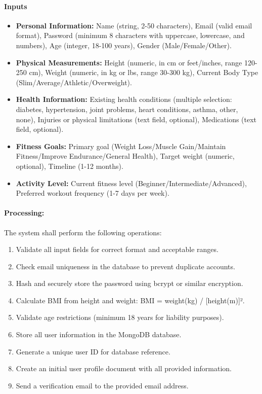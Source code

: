 \documentclass[12pt,a4paper]{article}
\begin{document}
\paragraph{Inputs}
\begin{itemize}
    \item \textbf{Personal Information:} Name (string, 2-50 characters), Email (valid email format), Password (minimum 8 characters with uppercase, lowercase, and numbers), Age (integer, 18-100 years), Gender (Male/Female/Other).
    \item \textbf{Physical Measurements:} Height (numeric, in cm or feet/inches, range 120-250 cm), Weight (numeric, in kg or lbs, range 30-300 kg), Current Body Type (Slim/Average/Athletic/Overweight).
    \item \textbf{Health Information:} Existing health conditions (multiple selection: diabetes, hypertension, joint problems, heart conditions, asthma, other, none), Injuries or physical limitations (text field, optional), Medications (text field, optional).
    \item \textbf{Fitness Goals:} Primary goal (Weight Loss/Muscle Gain/Maintain Fitness/Improve Endurance/General Health), Target weight (numeric, optional), Timeline (1-12 months).
    \item \textbf{Activity Level:} Current fitness level (Beginner/Intermediate/Advanced), Preferred workout frequency (1-7 days per week).
\end{itemize}

\paragraph{Processing:}
The system shall perform the following operations:
\begin{enumerate}
    \item Validate all input fields for correct format and acceptable ranges.
    \item Check email uniqueness in the database to prevent duplicate accounts.
    \item Hash and securely store the password using bcrypt or similar encryption.
    \item Calculate BMI from height and weight: BMI = weight(kg) / [height(m)]².
    \item Validate age restrictions (minimum 18 years for liability purposes).
    \item Store all user information in the MongoDB database.
    \item Generate a unique user ID for database reference.
    \item Create an initial user profile document with all provided information.
    \item Send a verification email to the provided email address.
\end{enumerate}
\end{document}
